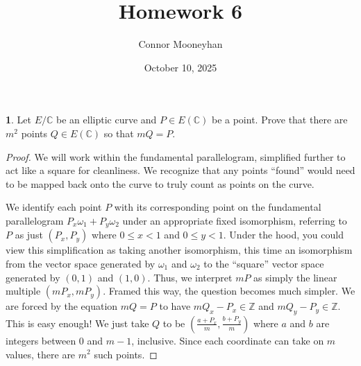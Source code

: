 \documentclass[12pt]{article}
\title{Homework 6}
\author{Connor Mooneyhan}
\date{October 10, 2025}
\theoremstyle{definition}
\newtheorem{ex}{}
\begin{document}
\maketitle

\begin{ex}
	Let $E/\mathbb{C}$ be an elliptic curve and $P \in E(\mathbb{C})$ be a point.
	Prove that there are $m^{2}$ points $Q \in E(\mathbb{C})$ so that $mQ = P$.
\end{ex}
\begin{proof}
  We will work within the fundamental parallelogram, simplified further to act like a square for cleanliness.
  We recognize that any points ``found'' would need to be mapped back onto the curve to truly count as points on the curve.

  We identify each point $P$ with its corresponding point on the fundamental parallelogram $P_x\omega_1 + P_y\omega_2$ under an appropriate fixed isomorphism, referring to $P$ as just $(P_x, P_y)$ where $0 \leq x < 1$ and $0 \leq y < 1$.
  Under the hood, you could view this simplification as taking another isomorphism, this time an isomorphism from the vector space generated by $\omega_1$ and $\omega_2$ to the ``square'' vector space generated by $(0, 1)$ and $(1, 0)$.
  Thus, we interpret $mP$ as simply the linear multiple $(mP_x, mP_y)$.
  Framed this way, the question becomes much simpler.
  We are forced by the equation $mQ = P$ to have $mQ_x - P_x \in \mathbb{Z}$ and $mQ_y - P_y \in \mathbb{Z}$.
  This is easy enough!
  We just take $Q$ to be $(\frac{a + P_x}{m}, \frac{b + P_y}{m })$ where $a$ and $b$ are integers between 0 and $m-1$, inclusive.
  Since each coordinate can take on $m$ values, there are $m^2$ such points.
\end{proof}
\end{document}

